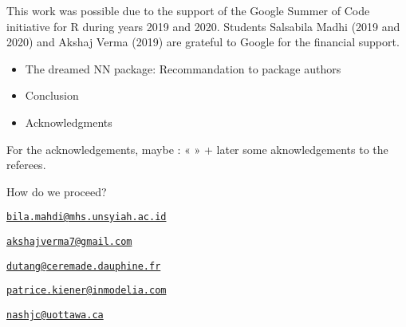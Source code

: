 This work was possible due to the support of the Google Summer of Code
initiative for R during years 2019 and 2020. Students Salsabila Madhi
(2019 and 2020) and Akshaj Verma (2019) are grateful to Google for the
financial support.



\begin{itemize}
\tightlist
\item
  The dreamed NN package: Recommandation to package authors
\item
  Conclusion
\item
  Acknowledgments
\end{itemize}

For the acknowledgements, maybe : « » + later some aknowledgements to
the referees.

How do we proceed?


\address{%
Salsabila Mahdi\\
Universitas Syiah Kuala\\
JL. Syech Abdurrauf No.3, Aceh 23111, Indonesia\\
}
\href{mailto:bila.mahdi@mhs.unsyiah.ac.id}{\nolinkurl{bila.mahdi@mhs.unsyiah.ac.id}}

\address{%
Akshaj Verma\\
Manipal Institute of Technology\\
Navi Mumbai, Maharashtra, 400614, India\\
}
\href{mailto:akshajverma7@gmail.com}{\nolinkurl{akshajverma7@gmail.com}}

\address{%
Christophe Dutang\\
Univ. Paris-Dauphine, Univ. PSL, CNRS, CEREMADE\\
Place du Ml de Lattre de Tassigny, 75016 Paris, France\\
}
\href{mailto:dutang@ceremade.dauphine.fr}{\nolinkurl{dutang@ceremade.dauphine.fr}}

\address{%
Patrice Kiener\\
InModelia\\
5 rue Malebranche, 75005 Paris, France\\
}
\href{mailto:patrice.kiener@inmodelia.com}{\nolinkurl{patrice.kiener@inmodelia.com}}

\address{%
John C. Nash\\
Telfer School of Management, University of Ottawa\\
55 Laurier Avenue East, Ottawa, Ontario K1N 6N5 Canada\\
}
\href{mailto:nashjc@uottawa.ca}{\nolinkurl{nashjc@uottawa.ca}}
